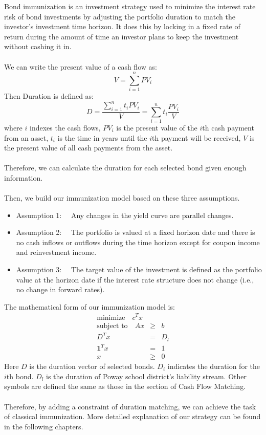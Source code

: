 \documentclass[oneside,12pt]{report}
\begin{document}
{Bond immunization is an investment strategy used to minimize the interest rate risk of bond investments by adjusting the portfolio duration to match the investor's investment time horizon. It does this by locking in a fixed rate of return during the amount of time an investor plans to keep the investment without cashing it in.\\
\\
We can write the present value of a cash flow as:
$$V = \sum_{i=1}^{n}PV_i$$
Then Duration is defined as:
$$D = \frac{\sum_{i=1}^{n}{t_i PV_i}} {V}  = \sum_{i=1}^{n}t_i \frac{{PV_i}} {V} $$
where
 $i$ indexes the cash flows,
 $PV_i$ is the present value of the $i$th cash payment from an asset,
$t_i$ is the time in years until the $i$th payment will be received,
 $V$ is the present value of all cash payments from the asset.\\
\\
Therefore, we can calculate the duration for each selected bond given enough information.\\
\\
Then, we build our immunization model based on these three assumptions.
\begin{itemize}
\item Assumption 1: ~~Any changes in the yield curve are parallel changes.
\item Assumption 2: ~~The portfolio is valued at a fixed horizon date and there is no cash inflows or outflows during the time horizon except for coupon income and reinvestment income.
\item Assumption 3: ~~The target value of the investment is defined as the portfolio value at the horizon date if the interest rate structure does not change (i.e., no change in forward rates).
\end{itemize}

\noindent The mathematical form of our immunization model is:
\begin{eqnarray*}
\textrm{minimize}\quad    c^T x &   &    \\
\textrm{subject to}\quad  Ax    & \geq& b   \\
                              D^T x & = & D_{l}\\
                  \mathbf{1}^T x & = & 1\\
                     x     & \geq &0
\end{eqnarray*}
Here $D$ is the duration vector of selected bonds. $D_i$ indicates the duration for the $i$th bond. $D_l$ is the duration of Poway school district's liability stream. Other symbols are defined the same as those in the section of Cash Flow Matching.\\
\\
Therefore, by adding a constraint of duration matching, we can achieve the task of classical immunization. More detailed explanation of our strategy can be found in the following chapters. 
}
\end{document}
